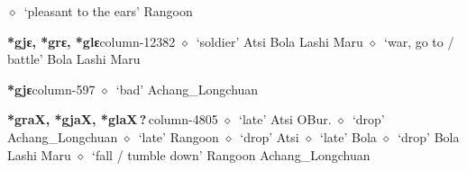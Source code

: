          $\diamond$~`pleasant to the ears'
         Rangoon 
  \item {\footnotesize \textbf{*gjɛ, *grɛ, *glɛ}}{\tiny column-12382}
         $\diamond$~`soldier'
         Atsi 
\hspace{1ex}
         Bola 
\hspace{1ex}
         Lashi 
\hspace{1ex}
         Maru 
\hspace{1ex}
         $\diamond$~`war, go to / battle'
         Bola 
\hspace{1ex}
         Lashi 
\hspace{1ex}
         Maru 
  \item {\footnotesize \textbf{*gjɛ}}{\tiny column-597}
         $\diamond$~`bad'
         Achang\_Longchuan 
  \item {\footnotesize \textbf{*graX, *gjaX, *glaX\,?\,}}{\tiny column-4805}
         $\diamond$~`late'
         Atsi 
\hspace{1ex}
         OBur. 
\hspace{1ex}
         $\diamond$~`drop'
         Achang\_Longchuan 
\hspace{1ex}
         $\diamond$~`late'
         Rangoon 
\hspace{1ex}
         $\diamond$~`drop'
         Atsi 
\hspace{1ex}
         $\diamond$~`late'
         Bola 
\hspace{1ex}
         $\diamond$~`drop'
         Bola 
\hspace{1ex}
         Lashi 
\hspace{1ex}
         Maru 
\hspace{1ex}
         $\diamond$~`fall / tumble down'
         Rangoon 
\hspace{1ex}
         Achang\_Longchuan 
